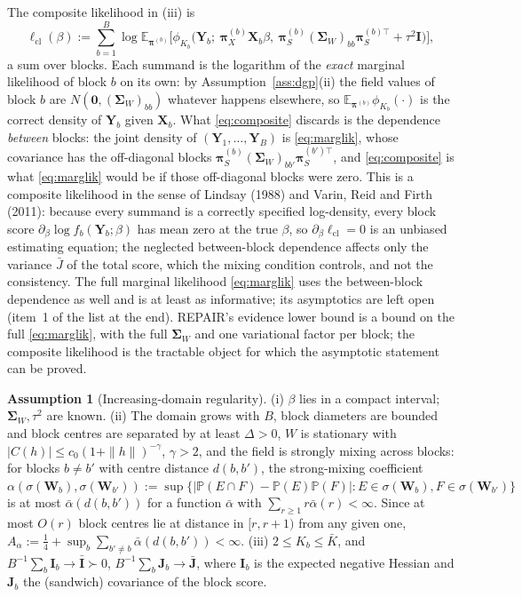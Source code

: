\documentclass[11pt]{article}
\theoremstyle{definition}
\newtheorem{assumption}{Assumption}
\newcommand{\bX}{\mathbf{X}}
\newcommand{\bY}{\mathbf{Y}}
\newcommand{\bW}{\mathbf{W}}
\newcommand{\bI}{\mathbf{I}}
\newcommand{\bzero}{\mathbf{0}}
\newcommand{\bSig}{\boldsymbol{\Sigma}}
\newcommand{\bpi}{\boldsymbol{\pi}}
\newcommand{\E}{\mathbb{E}}
\newcommand{\Prob}{\mathbb{P}}
\begin{document}
The composite likelihood in (iii) is
\begin{equation}\label{eq:composite}
\ell_{\mathrm{cl}}(\beta):=\sum_{b=1}^B\log\E_{\bpi^{(b)}}\Big[\phi_{K_b}\big(\bY_b;\ \bpi_X^{(b)}\bX_b\beta,\ \bpi_S^{(b)}(\bSig_W)_{bb}\bpi_S^{(b)\top}+\tau^2\bI\big)\Big],
\end{equation}
a sum over blocks. Each summand is the logarithm of the \emph{exact} marginal likelihood of block $b$ on its own: by Assumption~\ref{ass:dgp}(ii) the field values of block $b$ are $N(\bzero,(\bSig_W)_{bb})$ whatever happens elsewhere, so $\E_{\bpi^{(b)}}\phi_{K_b}(\cdot)$ is the correct density of $\bY_b$ given $\bX_b$. What \eqref{eq:composite} discards is the dependence \emph{between} blocks: the joint density of $(\bY_1,\dots,\bY_B)$ is \eqref{eq:marglik}, whose covariance has the off-diagonal blocks $\bpi_S^{(b)}(\bSig_W)_{bb'}\bpi_S^{(b')\top}$, and \eqref{eq:composite} is what \eqref{eq:marglik} would be if those off-diagonal blocks were zero. This is a composite likelihood in the sense of Lindsay (1988) and Varin, Reid and Firth (2011): because every summand is a correctly specified log-density, every block score $\partial_\beta\log f_b(\bY_b;\beta)$ has mean zero at the true $\beta$, so $\partial_\beta\ell_{\mathrm{cl}}=0$ is an unbiased estimating equation; the neglected between-block dependence affects only the variance $\bar J$ of the total score, which the mixing condition controls, and not the consistency. The full marginal likelihood \eqref{eq:marglik} uses the between-block dependence as well and is at least as informative; its asymptotics are left open (item~1 of the list at the end). REPAIR's evidence lower bound is a bound on the full \eqref{eq:marglik}, with the full $\bSig_W$ and one variational factor per block; the composite likelihood is the tractable object for which the asymptotic statement can be proved.

\begin{assumption}[Increasing-domain regularity]\label{ass:mixing}
(i) $\beta$ lies in a compact interval; $\bSig_W,\tau^2$ are known. (ii) The domain grows with $B$, block diameters are bounded and block centres are separated by at least $\Delta>0$, $W$ is stationary with $|C(h)|\le c_0(1+\|h\|)^{-\gamma}$, $\gamma>2$, and the field is strongly mixing across blocks: for blocks $b\ne b'$ with centre distance $d(b,b')$, the strong-mixing coefficient $\alpha(\sigma(\bW_b),\sigma(\bW_{b'})):=\sup\{|\Prob(E\cap F)-\Prob(E)\Prob(F)|:E\in\sigma(\bW_b),F\in\sigma(\bW_{b'})\}$ is at most $\bar\alpha(d(b,b'))$ for a function $\bar\alpha$ with $\sum_{r\ge1}r\bar\alpha(r)<\infty$. Since at most $O(r)$ block centres lie at distance in $[r,r+1)$ from any given one, $A_\alpha:=\tfrac14+\sup_b\sum_{b'\ne b}\bar\alpha(d(b,b'))<\infty$. (iii) $2\le K_b\le\bar K$, and $B^{-1}\sum_b\mathbf I_b\to\bar{\mathbf I}\succ0$, $B^{-1}\sum_b\mathbf J_b\to\bar{\mathbf J}$, where $\mathbf I_b$ is the expected negative Hessian and $\mathbf J_b$ the (sandwich) covariance of the block score.
\end{assumption}
\end{document}
